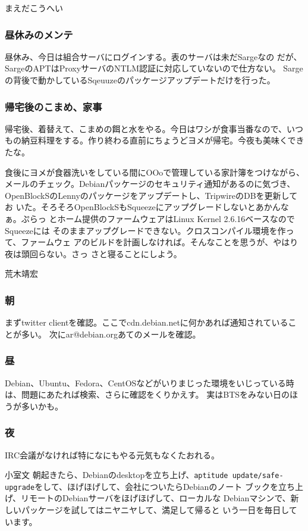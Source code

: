 \begin{prework}{ まえだこうへい }
\subsubsection{昼休みのメンテ}
昼休み、今日は組合サーバにログインする。表のサーバは未だSargeなの
だが、SargeのAPTはProxyサーバのNTLM認証に対応していないので仕方ない。
Sargeの背後で動かしているSqeuuzeのパッケージアップデートだけを行った。

\subsubsection{帰宅後のこまめ、家事}
帰宅後、着替えて、こまめの餌と水をやる。今日はワシが食事当番なので、いつ
もの納豆料理をする。作り終わる直前にちょうどヨメが帰宅。今夜も美味くでき
たな。

食後にヨメが食器洗いをしている間にOOoで管理している家計簿をつけながら、
メールのチェック。Debianパッケージのセキュリティ通知があるのに気づき、
OpenBlockSのLennyのパッケージをアップデートし、TripwireのDBを更新してお
いた。そろそろOpenBlockSもSqueezeにアップグレードしないとあかんなぁ。ぷらっ
とホーム提供のファームウェアはLinux Kernel 2.6.16ベースなのでSqueezeには
そのままアップグレードできない。クロスコンパイル環境を作って、ファームウェ
アのビルドを計画しなければ。そんなことを思うが、やはり夜は頭回らない。さっ
さと寝ることにしよう。
\end{prework}

\begin{prework}{ 荒木靖宏 }
\subsubsection{朝}
まずtwitter clientを確認。ここでcdn.debian.netに何かあれば通知されていることが多い。
次にar@debian.orgあてのメールを確認。

\subsubsection{昼}
Debian、Ubuntu、Fedora、CentOSなどがいりまじった環境をいじっている時は、問題にあたれば検索、さらに確認をくりかえす。
実はBTSをみない日のほうが多いかも。

\subsubsection{夜}
IRC会議がなければ特になにもやる元気もなくたおれる。
\end{prework}

\begin{prework}{ 小室文 }
 朝起きたら、Debianのdesktopを立ち上げ、\texttt{aptitude
 update/safe-upgrade}をして、ほげほげして、会社についたらDebianのノート
 ブックを立ち上げ、リモートのDebianサーバをほげほげして、ローカルな
 Debianマシンで、新しいパッケージを試してはニヤニヤして、満足して帰ると
 いう一日を毎日しています。
\end{prework}

